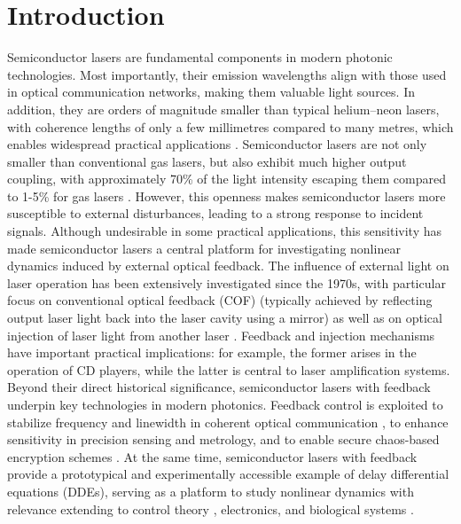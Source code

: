 \section{Introduction}
\label{sec:introduction}
%
Semiconductor lasers are fundamental components in modern photonic technologies.
Most importantly, their emission wavelengths align with those used in optical communication networks, making them valuable light sources. 
In addition, they are orders of magnitude smaller than typical helium–neon lasers, with coherence lengths of only a few millimetres compared to many metres, which enables widespread practical applications \cite{heiskanen2018photobiomodulation}.
Semiconductor lasers are not only smaller than conventional gas lasers, but also exhibit much higher output coupling, with approximately 70\% of the light intensity escaping them compared to 1-5\% for gas lasers \cite{vantartwijk1995semiconductor}.
However, this openness makes semiconductor lasers more susceptible to external disturbances, leading to a strong response to incident signals.
Although undesirable in some practical applications, this sensitivity has made semiconductor lasers a central platform for investigating nonlinear dynamics induced by external optical feedback.
The influence of external light on laser operation has been extensively investigated since the 1970s, with particular focus on conventional optical feedback (COF) (typically achieved by reflecting output laser light back into the laser cavity using a mirror) as well as on optical injection of laser light from another laser \cite{weiss1991dynamics}.
Feedback and injection mechanisms have important practical implications: for example, the former arises in the operation of CD players, while the latter is central to laser amplification systems.
Beyond their direct historical significance, semiconductor lasers with feedback underpin key technologies in modern photonics. 
Feedback control is exploited to stabilize frequency and linewidth in coherent optical communication \cite{tkach2003regimes}, to enhance sensitivity in precision sensing and metrology, and to enable secure chaos-based encryption schemes \cite{uchida2008fast}. 
At the same time, semiconductor lasers with feedback provide a prototypical and experimentally accessible example of delay differential equations (DDEs), serving as a platform to study nonlinear dynamics with relevance extending to control theory \cite{stepan1989retarded}, electronics, and biological systems \cite{mackey1977oscillation}.
%
%
